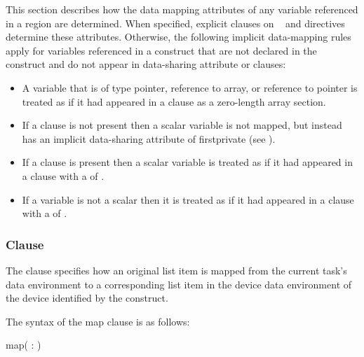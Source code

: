 This section describes how the data mapping attributes of any variable 
referenced in a  region are determined. When specified, 
explicit  clauses on ~ and  
directives determine these attributes. Otherwise, the following implicit 
data-mapping rules apply for variables referenced in a 
construct that are not declared in the construct and do not appear in 
data-sharing attribute or  clauses:

\begin{itemize}
\ccppspecificstart
\item A variable that is of type pointer, reference to array, or reference 
to pointer is treated as if it had appeared in a  clause as 
a zero-length array section.
\ccppspecificend

\item If a  clause is not present then 
a scalar variable is not mapped, but instead has an implicit data-sharing 
attribute of firstprivate (see 
).

\item If a  clause is present then a scalar 
variable is treated as if it had appeared in a  clause with a 
 of .

\item If a  variable is not a scalar then it is treated as if it had appeared 
in a  clause with a  of .
\end{itemize}


\subsubsection{ Clause}
\label{subsec:map Clause}
\summary
The  clause specifies how an original list item is mapped from the current task's data environment to a corresponding list item in the device data environment of the device identified by the construct.

\syntax
The syntax of the map clause is as follows:

\begin{boxedcode}
map(\plc{[ [map-type-modifier[,]] map-type} : \plc{] list})
\end{boxedcode}

